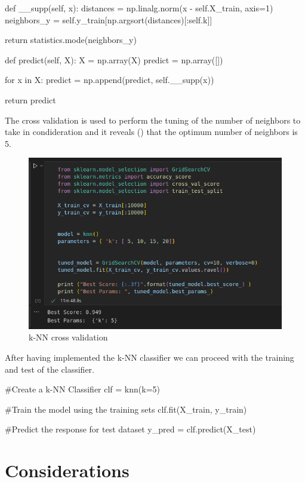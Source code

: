 \documentclass[12pt]{article}
\begin{document}
\begin{python}[caption={k-NN predict method},label={lst:knn_predict}]
def __supp(self, x):
    distances = np.linalg.norm(x - self.X_train, axis=1)
    neighbors_y = self.y_train[np.argsort(distances)[:self.k]]

    return statistics.mode(neighbors_y)


def predict(self, X):
    X = np.array(X)
    predict = np.array([])

    for x in X:
        predict = np.append(predict, self.__supp(x))

    return predict
\end{python}

The cross validation is used to perform the tuning of the number of neighbors to take
in condideration and it reveals () that the optimum number of neighbors is 5.

\begin{figure}[H]
    \centering
    \includegraphics[scale=0.6]{knn_cross.png}
    \caption{k-NN cross validation}
    \label{fig:knn_cross}
\end{figure}

After having implemented the k-NN classifier we can proceed with the training and 
test of the classifier.

\begin{python}[caption={k-NN predict method},label={lst:knn_predict}]
#Create a k-NN Classifier
clf = knn(k=5) 

#Train the model using the training sets
clf.fit(X_train, y_train)

#Predict the response for test dataset
y_pred = clf.predict(X_test)
\end{python}

\section{Considerations}
\end{document}
